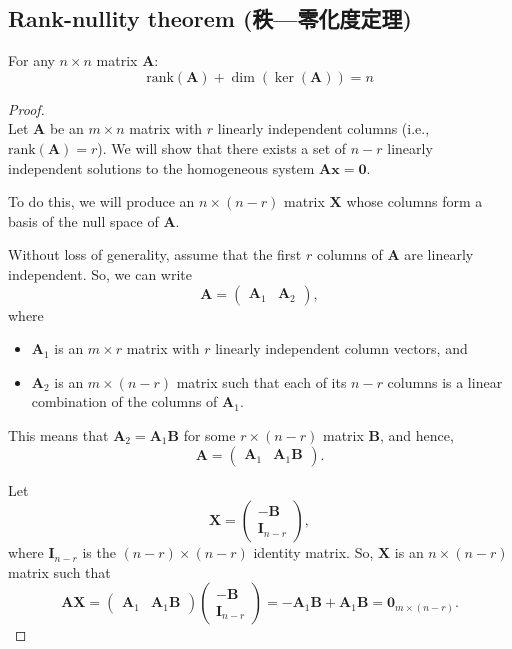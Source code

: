 \documentclass[a4paper,12pt]{report}
\begin{document}
\subsection{Rank-nullity theorem (秩—零化度定理)}
For any $n\times n$ matrix $\mathbf{A}$:
\[\text{rank}(\mathbf{A}) + \dim(\ker(\mathbf{A})) = n\]
\begin{proof}\mbox{}\\
Let \(\mathbf{A}\) be an \(m \times n\) matrix with \(r\) linearly independent columns (i.e., \(\text{rank}(\mathbf{A}) = r\)). We will show that there exists a set of \(n - r\) linearly independent solutions to the homogeneous system \(\mathbf{Ax} = \mathbf{0}\).

To do this, we will produce an \(n \times (n-r)\) matrix \(\mathbf{X}\) whose columns form a basis of the null space of \(\mathbf{A}\).

Without loss of generality, assume that the first \(r\) columns of \(\mathbf{A}\) are linearly independent. So, we can write
\[\mathbf{A} = \begin{pmatrix} \mathbf{A}_1 & \mathbf{A}_2\end{pmatrix},\]
where
\begin{itemize}
\item \(\mathbf{A}_1\) is an \(m \times r\) matrix with \(r\) linearly independent column vectors, and
\item \(\mathbf{A}_2\) is an \(m \times (n-r)\) matrix such that each of its \(n-r\) columns is a linear combination of the columns of \(\mathbf{A}_1\).
\end{itemize}

This means that \(\mathbf{A}_2 = \mathbf{A}_1\mathbf{B}\) for some \(r \times (n-r)\) matrix \(\mathbf{B}\), and hence,
\[\mathbf{A} = \begin{pmatrix} \mathbf{A}_1 & \mathbf{A}_1\mathbf{B}\end{pmatrix}.\]

Let
\[\mathbf{X} = \begin{pmatrix} -\mathbf{B} \\ \mathbf{I}_{n-r} \end{pmatrix},\]
where \(\mathbf{I}_{n-r}\) is the \((n-r) \times (n-r)\) identity matrix. So, \(\mathbf{X}\) is an \(n \times (n-r)\) matrix such that
\[\mathbf{A}\mathbf{X} = \begin{pmatrix}\mathbf{A}_1 & \mathbf{A}_1\mathbf{B} \end{pmatrix}\begin{pmatrix} -\mathbf{B} \\ \mathbf{I}_{n-r} \end{pmatrix} = -\mathbf{A}_1\mathbf{B} + \mathbf{A}_1\mathbf{B} = \mathbf{0}_{m \times (n-r)}.\]


\end{proof}
\end{document}
